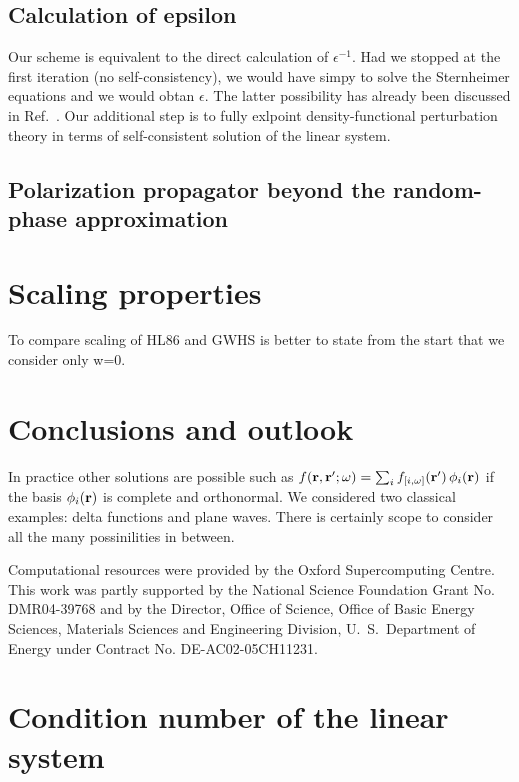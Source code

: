 \documentclass[twocolumn,prb,showpacs,superscriptaddress]{revtex4}
\def\w{\omega}
\def\r{{\bf r}}
\def\rp{{\bf r^\prime}}
\begin{document}
\subsection{Calculation of epsilon}

Our scheme is equivalent to the direct calculation of $\epsilon^{-1}$.
Had we stopped at the first iteration (no self-consistency), we would have
simpy to solve the Sternheimer equations and we would obtan $\epsilon$.
The latter possibility has already been discussed in Ref.\ .
Our additional step is to fully exlpoint density-functional perturbation theory
in terms of self-consistent solution of the linear system.

\subsection{Polarization propagator beyond the random-phase approximation}\label{sec.beyond_rpa}

\section{Scaling properties}

To compare scaling of HL86 and GWHS is better to state from the start that
we consider only w=0.

\section{Conclusions and outlook}

In practice other solutions are possible such as $f(\r,\rp;\w) = \sum_i f_{[i,\w]}(\rp) \, \phi_i(\r)$
if the basis $\phi_i(\r)$ is complete and orthonormal. We considered two classical
examples: delta functions and plane waves. There is certainly scope to consider
all the many possinilities in between.

\begin{acknowledgments}
Computational resources were provided by the Oxford Supercomputing Centre.
This work was partly supported by the National Science Foundation Grant No. DMR04-39768 and by
the Director, Office of Science, Office of Basic Energy Sciences, Materials Sciences
and Engineering Division, U.\ S.\ Department of Energy under Contract No. DE-AC02-05CH11231.
\end{acknowledgments}

\appendix

\section{Condition number of the linear system}\label{app.condition}
\end{document}
